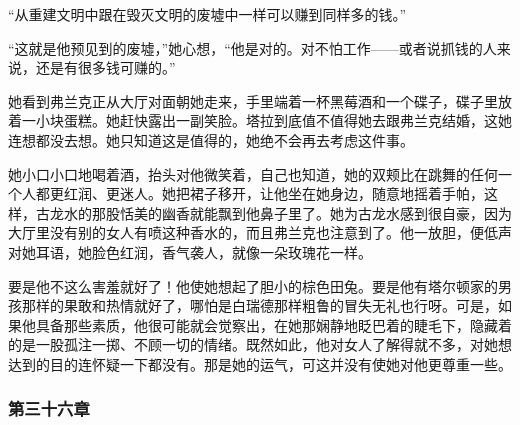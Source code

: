 \par “从重建文明中跟在毁灭文明的废墟中一样可以赚到同样多的钱。”
\par “这就是他预见到的废墟，”她心想，“他是对的。对不怕工作——或者说抓钱的人来说，还是有很多钱可赚的。”
\par 她看到弗兰克正从大厅对面朝她走来，手里端着一杯黑莓酒和一个碟子，碟子里放着一小块蛋糕。她赶快露出一副笑脸。塔拉到底值不值得她去跟弗兰克结婚，这她连想都没去想。她只知道这是值得的，她绝不会再去考虑这件事。
\par 她小口小口地喝着酒，抬头对他微笑着，自己也知道，她的双颊比在跳舞的任何一个人都更红润、更迷人。她把裙子移开，让他坐在她身边，随意地摇着手帕，这样，古龙水的那股恬美的幽香就能飘到他鼻子里了。她为古龙水感到很自豪，因为大厅里没有别的女人有喷这种香水的，而且弗兰克也注意到了。他一放胆，便低声对她耳语，她脸色红润，香气袭人，就像一朵玫瑰花一样。
\par 要是他不这么害羞就好了！他使她想起了胆小的棕色田兔。要是他有塔尔顿家的男孩那样的果敢和热情就好了，哪怕是白瑞德那样粗鲁的冒失无礼也行呀。可是，如果他具备那些素质，他很可能就会觉察出，在她那娴静地眨巴着的睫毛下，隐藏着的是一股孤注一掷、不顾一切的情绪。既然如此，他对女人了解得就不多，对她想达到的目的连怀疑一下都没有。那是她的运气，可这并没有使她对他更尊重一些。

\subsubsection{第三十六章}

